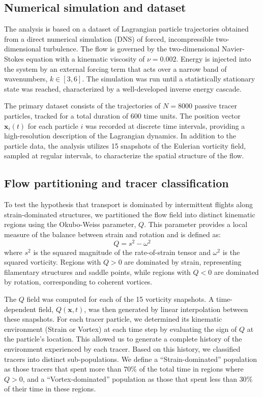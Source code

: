 \documentclass[]{article}
\begin{document}
\subsection{Numerical simulation and dataset}
The analysis is based on a dataset of Lagrangian particle trajectories obtained from a direct numerical simulation (DNS) of forced, incompressible two-dimensional turbulence. The flow is governed by the two-dimensional Navier-Stokes equation with a kinematic viscosity of $\nu = 0.002$. Energy is injected into the system by an external forcing term that acts over a narrow band of wavenumbers, $k \in [3, 6]$. The simulation was run until a statistically stationary state was reached, characterized by a well-developed inverse energy cascade.

The primary dataset consists of the trajectories of $N=8000$ passive tracer particles, tracked for a total duration of $600$ time units. The position vector $\mathbf{x}_i(t)$ for each particle $i$ was recorded at discrete time intervals, providing a high-resolution description of the Lagrangian dynamics. In addition to the particle data, the analysis utilizes 15 snapshots of the Eulerian vorticity field, sampled at regular intervals, to characterize the spatial structure of the flow.

\subsection{Flow partitioning and tracer classification}
To test the hypothesis that transport is dominated by intermittent flights along strain-dominated structures, we partitioned the flow field into distinct kinematic regions using the Okubo-Weiss parameter, $Q$. This parameter provides a local measure of the balance between strain and rotation and is defined as:
\begin{equation}
Q = s^2 - \omega^2
\end{equation}
where $s^2$ is the squared magnitude of the rate-of-strain tensor and $\omega^2$ is the squared vorticity. Regions with $Q > 0$ are dominated by strain, representing filamentary structures and saddle points, while regions with $Q < 0$ are dominated by rotation, corresponding to coherent vortices.

The $Q$ field was computed for each of the 15 vorticity snapshots. A time-dependent field, $Q(\mathbf{x}, t)$, was then generated by linear interpolation between these snapshots. For each tracer particle, we determined its kinematic environment (Strain or Vortex) at each time step by evaluating the sign of $Q$ at the particle's location. This allowed us to generate a complete history of the environment experienced by each tracer. Based on this history, we classified tracers into distinct sub-populations. We define a ``Strain-dominated'' population as those tracers that spent more than $70\%$ of the total time in regions where $Q>0$, and a ``Vortex-dominated'' population as those that spent less than $30\%$ of their time in these regions.
\end{document}
